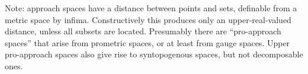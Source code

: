 \documentclass{article}
\begin{document}
Note: approach spaces have a distance between points and sets, definable from a metric space by infima.
Constructively this produces only an upper-real-valued distance, unless all subsets are located.
Presumably there are ``pro-approach spaces'' that arise from prometric spaces, or at least from gauge spaces.
Upper pro-approach spaces also give rise to syntopogenous spaces, but not decomposable ones.




\end{document}
